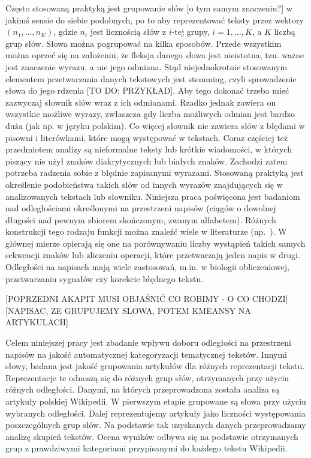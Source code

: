 \documentclass{praca1}
\begin{document}
Często stosowaną praktyką jest grupowanie słów [o tym samym znaczeniu?] w jakimś sensie do siebie podobnych, po to aby reprezentować teksty przez wektory $(n_1,\ldots, n_K)$, gdzie $n_i$ jest licznością słów z $i$-tej grupy, $i = 1,\ldots,K$, a $K$ liczbą grup słów.  Słowa można pogrupować na kilka sposobów. Przede wszystkim można oprzeć się na założeniu, że fleksja danego słowa jest nieistotna, tzn. ważne jest znaczenie wyrazu, a nie jego odmiana. Stąd niejednokrotnie stosowanym elementem przetwarzania danych tekstowych jest stemming, czyli sprowadzenie słowa do jego rdzenia [TO DO: PRZYKŁAD]. Aby tego dokonać trzeba mieć zazwyczaj słownik słów wraz z ich odmianami. Rzadko jednak zawiera on wszystkie możliwe wyrazy, zwłaszcza gdy liczba możliwych odmian jest bardzo duża (jak np. w języku polskim). Co więcej słownik nie zawiera słów z błędami w pisowni i literówkami, które mogą występować w tekstach. Coraz częściej też przedmiotem analizy są nieformalne teksty lub krótkie wiadomości, w których piszący nie użył znaków diakrytycznych lub białych znaków. Zachodzi zatem potrzeba radzenia sobie z błędnie zapisanymi wyrazami. Stosowaną praktyką jest określenie podobieństwa takich słów od innych wyrazów znajdujących się w analizowanych tekstach lub słowniku. Niniejsza praca poświęcona jest badaniom nad odległościami określonymi na przestrzeni napisów (ciągów o dowolnej długości nad pewnym zbiorem skończonym, zwanym alfabetem). Różnych konstrukcji tego rodzaju funkcji można znaleźć wiele w literaturze (np.~\cite{Levenshtein1965:binarycodes, Boytsov2011:indexingmethods, Navarro2001:guidedtour}). W głównej mierze opierają się one na porównywaniu liczby wystąpień takich samych sekwencji znaków lub zliczeniu operacji, które przetwarzają jeden napis w drugi. Odległości na napisach mają wiele zastosowań, m.in. w biologii obliczeniowej, przetwarzaniu sygnałów czy korekcie błędnego tekstu.

[POPRZEDNI AKAPIT MUSI OBJAŚNIĆ CO ROBIMY - O CO CHODZI]
[NAPISAC, ZE GRUPUJEMY SLOWA, POTEM KMEANSY NA ARTYKULACH]

Celem niniejszej pracy jest zbadanie wpływu doboru odległości na przestrzeni napisów na jakość automatycznej kategoryzacji tematycznej tekstów. Innymi słowy, badana jest jakość grupowania artykułów dla różnych reprezentacji tekstu. Reprezentacje te odnoszą się do różnych grup słów, otrzymanych przy użyciu różnych odległości. Danymi, na których przeprowadzona została analiza są artykuły polskiej Wikipedii. W pierwszym etapie grupowane są słowa przy użyciu wybranych odległości. Dalej reprezentujemy artykuły jako liczności występowania poszczególnych grup słów. Na podstawie tak uzyskanych danych przeprowadzamy analizę skupień tekstów. Ocena wyników odbywa się na podstawie otrzymanych  grup z prawdziwymi kategoriami przypisanymi do każdego tekstu Wikipedii.
\end{document}
